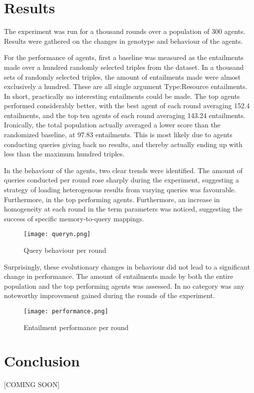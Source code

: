 \documentclass[thesis,12pt]{article}
\begin{document}
\section{Results}
The experiment was run for a thousand rounds over a population of 300 agents. Results were gathered on the changes in genotype and behaviour of the agents. 

For the performance of agents, first a baseline was measured as the entailments made over a hundred randomly selected triples from the dataset. In a thousand sets of randomly selected triples, the amount of entailments made were almost exclusively a hundred. These are all single argument Type:Resource entailments. In short, practically no interesting entailments could be made.
The top agents performed considerably better, with the best agent of each round averaging 152.4 entailments, and the top ten agents of each round averaging 143.24 entailments. Ironically, the total population actually averaged a lower score than the randomized baseline, at 97.83 entailments. This is most likely due to agents conducting queries giving back no results, and thereby actually ending up with less than the maximum hundred triples. 

In the behaviour of the agents, two clear trends were identified. The amount of queries conducted per round rose sharply during the experiment, suggesting a strategy of loading heterogenous results from varying queries was favourable. Furthermore, in the top performing agents. Furthermore, an increase in homogeneity at each round in the term parameters was noticed, suggesting the success of specific memory-to-query mappings. 

\begin{figure}[h]
\centering
\texttt{[image: queryn.png]}
\caption{Query behaviour per round}
\end{figure} 

Surprisingly, these evolutionary changes in behaviour did not lead to a significant change in performance. The amount of entailments made by both the entire population and the top performing agents was assessed. In no category was any noteworthy improvement gained during the rounds of the experiment.

\begin{figure}[h]
\centering
\texttt{[image: performance.png]}
\caption{Entailment performance per round}
\end{figure} 

\section{Conclusion}
[COMING SOON]
\end{document}
